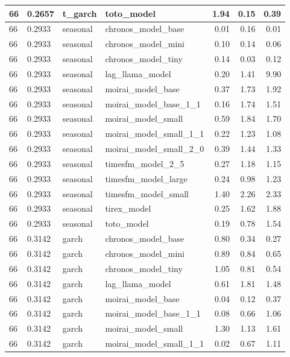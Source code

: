 {\begin{tabular}{llllrrr}
\midrule
66 & 0.2657 & t\_garch & toto\_model & 1.94 & 0.15 & 0.39 \\
\midrule
66 & 0.2933 & seasonal & chronos\_model\_base & 0.01 & 0.16 & 0.01 \\
\midrule
66 & 0.2933 & seasonal & chronos\_model\_mini & 0.10 & 0.14 & 0.06 \\
\midrule
66 & 0.2933 & seasonal & chronos\_model\_tiny & 0.14 & 0.03 & 0.12 \\
\midrule
66 & 0.2933 & seasonal & lag\_llama\_model & 0.20 & 1.41 & 9.90 \\
\midrule
66 & 0.2933 & seasonal & moirai\_model\_base & 0.37 & 1.73 & 1.92 \\
\midrule
66 & 0.2933 & seasonal & moirai\_model\_base\_1\_1 & 0.16 & 1.74 & 1.51 \\
\midrule
66 & 0.2933 & seasonal & moirai\_model\_small & 0.59 & 1.84 & 1.70 \\
\midrule
66 & 0.2933 & seasonal & moirai\_model\_small\_1\_1 & 0.22 & 1.23 & 1.08 \\
\midrule
66 & 0.2933 & seasonal & moirai\_model\_small\_2\_0 & 0.39 & 1.44 & 1.33 \\
\midrule
66 & 0.2933 & seasonal & timesfm\_model\_2\_5 & 0.27 & 1.18 & 1.15 \\
\midrule
66 & 0.2933 & seasonal & timesfm\_model\_large & 0.24 & 0.98 & 1.23 \\
\midrule
66 & 0.2933 & seasonal & timesfm\_model\_small & 1.40 & 2.26 & 2.33 \\
\midrule
66 & 0.2933 & seasonal & tirex\_model & 0.25 & 1.62 & 1.88 \\
\midrule
66 & 0.2933 & seasonal & toto\_model & 0.19 & 0.78 & 1.54 \\
\midrule
66 & 0.3142 & garch & chronos\_model\_base & 0.80 & 0.34 & 0.27 \\
\midrule
66 & 0.3142 & garch & chronos\_model\_mini & 0.89 & 0.84 & 0.65 \\
\midrule
66 & 0.3142 & garch & chronos\_model\_tiny & 1.05 & 0.81 & 0.54 \\
\midrule
66 & 0.3142 & garch & lag\_llama\_model & 0.61 & 1.81 & 1.48 \\
\midrule
66 & 0.3142 & garch & moirai\_model\_base & 0.04 & 0.12 & 0.37 \\
\midrule
66 & 0.3142 & garch & moirai\_model\_base\_1\_1 & 0.08 & 0.66 & 1.06 \\
\midrule
66 & 0.3142 & garch & moirai\_model\_small & 1.30 & 1.13 & 1.61 \\
\midrule
66 & 0.3142 & garch & moirai\_model\_small\_1\_1 & 0.02 & 0.67 & 1.11 \\

\end{tabular}}
